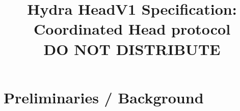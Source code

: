 \documentclass[11pt]{article}
\begin{document}
\date{}

\title{\Large \textbf{Hydra HeadV1 Specification: Coordinated Head protocol}\\[2ex] DO NOT DISTRIBUTE}
\author{}

\maketitle



\section{Preliminaries / Background}










\end{document}
